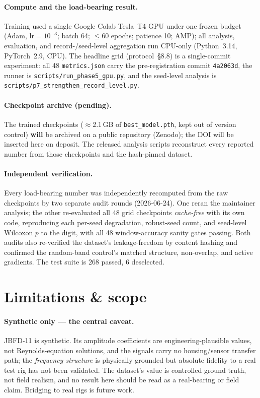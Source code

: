 \documentclass{article}
\newcommand{\code}[1]{\nolinkurl{#1}}
\begin{document}
\paragraph{Compute and the load-bearing result.}
Training used a single Google Colab Tesla~T4 GPU under one frozen budget (Adam,
$\mathrm{lr}=10^{-3}$; batch 64; $\le$60 epochs; patience 10; AMP); all analysis,
evaluation, and record-/seed-level aggregation run CPU-only (Python~3.14,
PyTorch~2.9, CPU). The headline grid (protocol~\S8.8) is a single-commit
experiment: all 48 \code{metrics.json} carry the pre-registration commit
\code{4a2063d}, the runner
is \code{scripts/run_phase5_gpu.py}, and the seed-level analysis is
\code{scripts/p7_strengthen_record_level.py}.

\paragraph{Checkpoint archive (pending).}
The trained checkpoints ($\approx$2.1\,GB of \code{best_model.pth}, kept out of
version control) \textbf{will} be archived on a public repository (Zenodo); the
DOI will be inserted here on deposit. The released analysis scripts reconstruct
every reported number from those checkpoints and the hash-pinned dataset.

\paragraph{Independent verification.}
Every load-bearing number was independently recomputed from the raw checkpoints
by two separate audit rounds (2026-06-24). One reran the maintainer analysis; the
other re-evaluated all 48 grid checkpoints \emph{cache-free} with its own code,
reproducing each per-seed degradation, robust-seed count, and seed-level Wilcoxon
$p$ to the digit, with all 48 window-accuracy sanity gates passing. Both audits
also re-verified the dataset's leakage-freedom by content hashing and confirmed
the random-band control's matched structure, non-overlap, and active gradients.
The test suite is 268 passed, 6 deselected.

\section{Limitations \& scope}
\label{sec:limitations}
\paragraph{Synthetic only --- the central caveat.}
JBFD-11 is synthetic. Its amplitude coefficients are engineering-plausible
values, not Reynolds-equation solutions, and the signals carry no
housing/sensor transfer path; the \emph{frequency structure} is physically
grounded but absolute fidelity to a real test rig has not been validated. The
dataset's value is controlled ground truth, not field realism, and no result
here should be read as a real-bearing or field claim. Bridging to real rigs is
future work.
\end{document}

